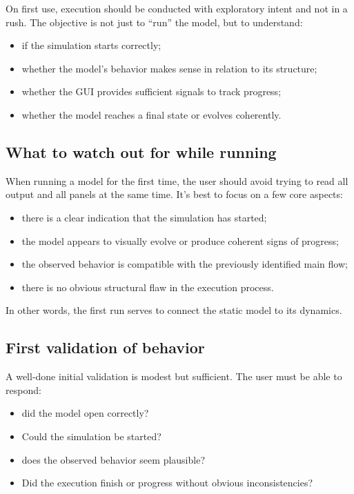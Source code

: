 On first use, execution should be conducted with exploratory intent and not in a rush. The objective is not just to ``run'' the model, but to understand:
\begin{itemize}
\item if the simulation starts correctly;
\item whether the model's behavior makes sense in relation to its structure;
\item whether the GUI provides sufficient signals to track progress;
\item whether the model reaches a final state or evolves coherently.
\end{itemize}

\subsection{What to watch out for while running}
\label{subsec:cap4_o_que_observar_durante_execucao}

When running a model for the first time, the user should avoid trying to read all output and all panels at the same time. It's best to focus on a few core aspects:

\begin{itemize}
\item there is a clear indication that the simulation has started;
\item the model appears to visually evolve or produce coherent signs of progress;
\item the observed behavior is compatible with the previously identified main flow;
\item there is no obvious structural flaw in the execution process.
\end{itemize}

In other words, the first run serves to connect the static model to its dynamics.

\subsection{First validation of behavior}
\label{subsec:cap4_primeira_validacao}

A well-done initial validation is modest but sufficient. The user must be able to respond:
\begin{itemize}
\item did the model open correctly?
\item Could the simulation be started?
\item does the observed behavior seem plausible?
\item Did the execution finish or progress without obvious inconsistencies?
\end{itemize}

